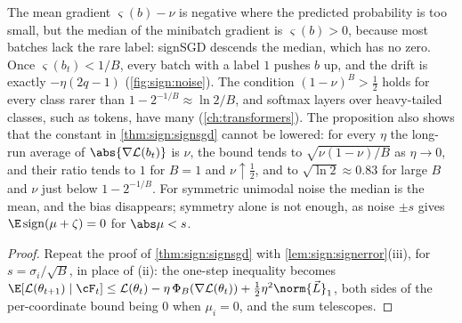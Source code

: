 \begin{refsection}
The mean gradient $\varsigma(b)-\nu$ is negative where the predicted probability is too small, but the median of the minibatch gradient is $\varsigma(b)>0$, because most batches lack the rare label: signSGD descends the median, which has no zero. Once $\varsigma(b_t)<1/B$, every batch with a label $1$ pushes $b$ up, and the drift is exactly $-\eta(2q-1)$ (\cref{fig:sign:noise}). The condition $(1-\nu)^B>\frac12$ holds for every class rarer than $1-2^{-1/B}\approx\ln2/B$, and softmax layers over heavy-tailed classes, such as tokens, have many (\cref{ch:transformers}). The proposition also shows that the constant in \cref{thm:sign:signsgd} cannot be lowered: for every $\eta$ the long-run average of $\abs{\nabla\Loss(b_t)}$ is $\nu$, the bound tends to $\sqrt{\nu(1-\nu)/B}$ as $\eta\to0$, and their ratio tends to $1$ for $B=1$ and $\nu\uparrow\frac12$, and to $\sqrt{\ln2}\approx0.83$ for large $B$ and $\nu$ just below $1-2^{-1/B}$. For symmetric unimodal noise the median is the mean, and the bias disappears; symmetry alone is not enough, as noise $\pm s$ gives $\E\sign(\mu+\zeta)=0$ for $\abs\mu<s$.


\begin{proof}
Repeat the proof of \cref{thm:sign:signsgd} with \cref{lem:sign:signerror}(iii), for $s=\sigma_i/\sqrt B$, in place of (ii): the one-step inequality becomes $\E[\Loss(\theta_{t+1})\mid\cF_t]\le\Loss(\theta_t)-\eta\,\Phi_B(\nabla\Loss(\theta_t))+\frac12\eta^2\norm{\vec L}_1$, both sides of the per-coordinate bound being $0$ when $\mu_i=0$, and the sum telescopes.
\end{proof}


\end{refsection}
